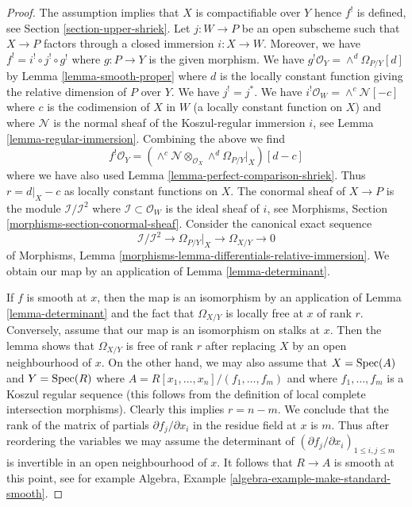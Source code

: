 \begin{proof}
The assumption implies that $X$ is compactifiable over $Y$ hence $f^!$
is defined, see Section \ref{section-upper-shriek}.
Let $j : W \to P$ be an open subscheme such that
$X \to P$ factors through a closed immersion $i : X \to W$.
Moreover, we have $f^! = i^! \circ j^! \circ g^!$ where
$g : P \to Y$ is the given morphism.
We have $g^!\mathcal{O}_Y = \wedge^d\Omega_{P/Y}[d]$ by
Lemma \ref{lemma-smooth-proper} where $d$ is the locally
constant function giving the relative dimension of $P$ over $Y$.
We have $j^! = j^*$. We have $i^!\mathcal{O}_W = \wedge^c\mathcal{N}[-c]$
where $c$ is the codimension of $X$ in $W$ (a locally constant
function on $X$) and where $\mathcal{N}$ is the normal sheaf of
the Koszul-regular immersion $i$, see Lemma \ref{lemma-regular-immersion}.
Combining the above we find
$$
f^!\mathcal{O}_Y =
\left(\wedge^c\mathcal{N} \otimes_{\mathcal{O}_X}
\wedge^d\Omega_{P/Y}|_X\right)[d - c]
$$
where we have also used Lemma \ref{lemma-perfect-comparison-shriek}.
Thus $r = d|_X - c$ as locally constant functions on $X$.
The conormal sheaf of $X \to P$ is the module
$\mathcal{I}/\mathcal{I}^2$ where $\mathcal{I} \subset \mathcal{O}_W$
is the ideal sheaf of $i$, see
Morphisms, Section \ref{morphisms-section-conormal-sheaf}.
Consider the canonical exact sequence
$$
\mathcal{I}/\mathcal{I}^2 \to
\Omega_{P/Y}|_X \to \Omega_{X/Y} \to 0
$$
of Morphisms, Lemma \ref{morphisms-lemma-differentials-relative-immersion}.
We obtain our map by an application of Lemma \ref{lemma-determinant}.

\medskip\noindent
If $f$ is smooth at $x$, then the map is an isomorphism by an application of
Lemma \ref{lemma-determinant}
and the fact that $\Omega_{X/Y}$ is locally free at $x$
of rank $r$. Conversely, assume that our map is an isomorphism on stalks
at $x$. Then the lemma shows that $\Omega_{X/Y}$ is free of rank $r$
after replacing $X$ by an open neighbourhood of $x$.
On the other hand, we may also assume that $X = \mathop{\mathrm{Spec}}(A)$ and
$Y = \mathop{\mathrm{Spec}}(R)$ where $A = R[x_1, \ldots, x_n]/(f_1, \ldots, f_m)$
and where $f_1, \ldots, f_m$ is a Koszul regular sequence
(this follows from the definition of local complete intersection morphisms).
Clearly this implies $r = n - m$. We conclude that the rank of the matrix
of partials $\partial f_j/\partial x_i$ in the residue field at $x$ is $m$.
Thus after reordering the variables we may assume
the determinant of $(\partial f_j/\partial x_i)_{1 \leq i, j \leq m}$
is invertible in an open neighbourhood of $x$. It follows
that $R \to A$ is smooth at this point, see for example
Algebra, Example \ref{algebra-example-make-standard-smooth}.
\end{proof}

